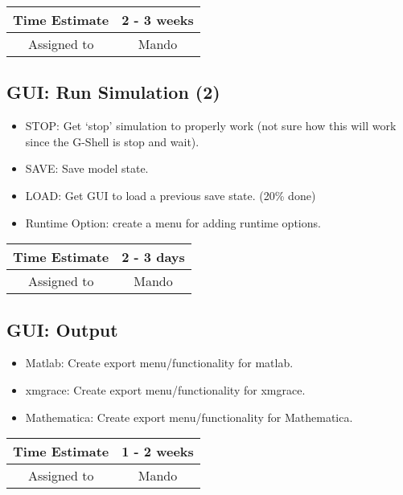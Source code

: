 \documentclass[12pt]{article}
\begin{document}
\begin{center}
  \vspace{5mm}
  \centering
  \begin{tabular}{|c|c|}
    \hline
    Time Estimate
    & 2 - 3 weeks \\
    \hline
    Assigned to
    & Mando \\
    \hline
  \end{tabular}
\end{center}


\subsection{GUI: Run Simulation (2)}
\begin{itemize}
\item STOP: Get `stop' simulation to properly work (not sure how this
  will work since the G-Shell is stop and wait).
\item SAVE: Save model state. 
\item LOAD: Get GUI to load a previous save state. (20\% done)
\item Runtime Option: create a menu for adding runtime options.
\end{itemize}

\begin{center}
  \vspace{5mm}
  \centering
  \begin{tabular}{|c|c|}
    \hline
    Time Estimate
    & 2 - 3 days \\
    \hline
    Assigned to
    & Mando \\
    \hline
  \end{tabular}
\end{center}


\subsection{GUI: Output}
\begin{itemize}
\item Matlab: Create export menu/functionality for matlab.
\item xmgrace: Create export menu/functionality for xmgrace.
\item Mathematica: Create export menu/functionality for Mathematica.
\end{itemize}

\begin{center}
  \vspace{5mm}
  \centering
  \begin{tabular}{|c|c|}
    \hline
    Time Estimate
    & 1 - 2 weeks \\
    \hline
    Assigned to
    & Mando \\
    \hline
  \end{tabular}
\end{center}
\end{document}
